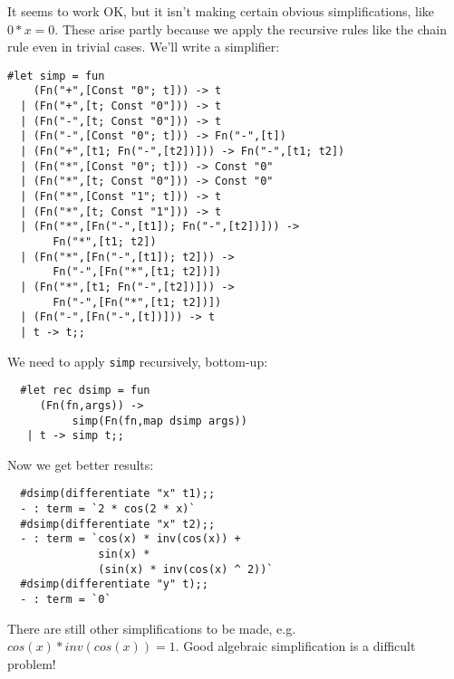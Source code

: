 \begin{slide*}


It seems to work OK, but it isn't making certain obvious simplifications,
like {\red $0 * x = 0$}. These arise partly because we apply the recursive
rules like the chain rule even in trivial cases. We'll write a simplifier:

\begin{black}\begin{footnotesize}\begin{verbatim}
#let simp = fun
    (Fn("+",[Const "0"; t])) -> t
  | (Fn("+",[t; Const "0"])) -> t
  | (Fn("-",[t; Const "0"])) -> t
  | (Fn("-",[Const "0"; t])) -> Fn("-",[t])
  | (Fn("+",[t1; Fn("-",[t2])])) -> Fn("-",[t1; t2])
  | (Fn("*",[Const "0"; t])) -> Const "0"
  | (Fn("*",[t; Const "0"])) -> Const "0"
  | (Fn("*",[Const "1"; t])) -> t
  | (Fn("*",[t; Const "1"])) -> t
  | (Fn("*",[Fn("-",[t1]); Fn("-",[t2])])) ->
       Fn("*",[t1; t2])
  | (Fn("*",[Fn("-",[t1]); t2])) ->
       Fn("-",[Fn("*",[t1; t2])])
  | (Fn("*",[t1; Fn("-",[t2])])) ->
       Fn("-",[Fn("*",[t1; t2])])
  | (Fn("-",[Fn("-",[t])])) -> t
  | t -> t;;
\end{verbatim}\end{footnotesize}\end{black}

\end{slide*}




\begin{slide*}


We need to apply {\black \tt simp} recursively, bottom-up:

\begin{black}\begin{verbatim}
  #let rec dsimp = fun
     (Fn(fn,args)) ->
          simp(Fn(fn,map dsimp args))
   | t -> simp t;;
\end{verbatim}\end{black}

Now we get better results:

\begin{black}\begin{verbatim}
  #dsimp(differentiate "x" t1);;
  - : term = `2 * cos(2 * x)`
  #dsimp(differentiate "x" t2);;
  - : term = `cos(x) * inv(cos(x)) +
              sin(x) *
              (sin(x) * inv(cos(x) ^ 2))`
  #dsimp(differentiate "y" t);;
  - : term = `0`
\end{verbatim}\end{black}

There are still other simplifications to be made, e.g. {\red $cos(x) *
inv(cos(x)) = 1$}. Good algebraic simplification is a difficult problem!

\end{slide*}





